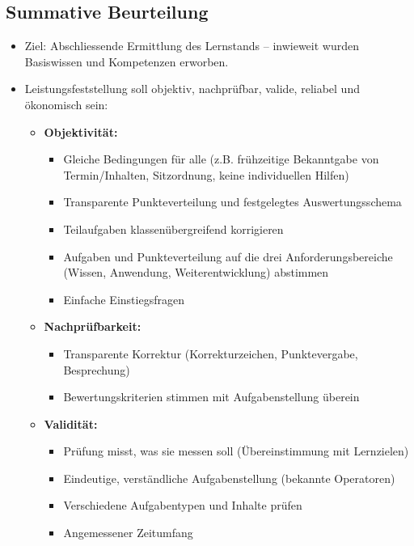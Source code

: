 \subsection{Summative Beurteilung}
\begin{itemize}
  \item Ziel: Abschliessende Ermittlung des Lernstands -- inwieweit wurden Basiswissen und Kompetenzen erworben.
  \item Leistungsfeststellung soll objektiv, nachprüfbar, valide, reliabel und ökonomisch sein:
        \begin{itemize}
          \item \textbf{Objektivität:}
                \begin{itemize}
                  \item Gleiche Bedingungen für alle (z.B. frühzeitige Bekanntgabe von Termin/Inhalten, Sitzordnung, keine individuellen Hilfen)
                  \item Transparente Punkteverteilung und festgelegtes Auswertungsschema
                  \item Teilaufgaben klassenübergreifend korrigieren
                  \item Aufgaben und Punkteverteilung auf die drei Anforderungsbereiche (Wissen, Anwendung, Weiterentwicklung) abstimmen
                  \item Einfache Einstiegsfragen
                \end{itemize}
          \item \textbf{Nachprüfbarkeit:}
                \begin{itemize}
                  \item Transparente Korrektur (Korrekturzeichen, Punktevergabe, Besprechung)
                  \item Bewertungskriterien stimmen mit Aufgabenstellung überein
                \end{itemize}
          \item \textbf{Validität:}
                \begin{itemize}
                  \item Prüfung misst, was sie messen soll (Übereinstimmung mit Lernzielen)
                  \item Eindeutige, verständliche Aufgabenstellung (bekannte Operatoren)
                  \item Verschiedene Aufgabentypen und Inhalte prüfen
                  \item Angemessener Zeitumfang

\end{itemize}
\end{itemize}
\end{itemize}
